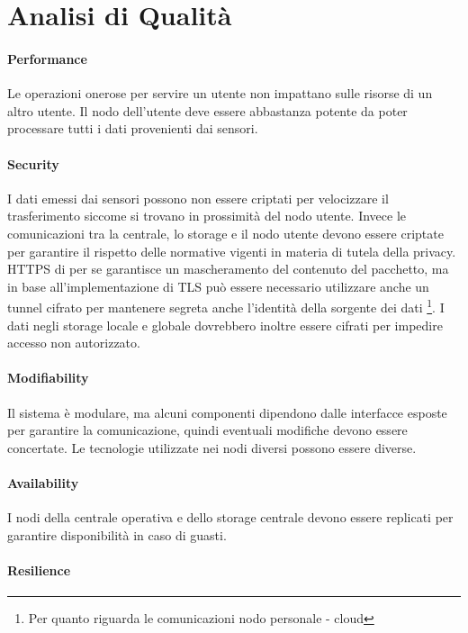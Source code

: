 \documentclass[a4paper,11pt,oneside, table]{article}
\begin{document}
\section{Analisi di Qualit\`a}

\paragraph{Performance}

Le operazioni onerose per servire un utente non impattano sulle risorse di un altro utente.
Il nodo dell'utente deve essere abbastanza potente da poter processare tutti i dati provenienti dai sensori.

\paragraph{Security}

I dati emessi dai sensori possono non essere criptati per velocizzare il trasferimento siccome si trovano in prossimit\`a del nodo utente. Invece le comunicazioni tra la centrale, lo storage e il nodo utente devono essere criptate per garantire il rispetto delle normative vigenti in materia di tutela della privacy. HTTPS di per se garantisce un mascheramento del contenuto del pacchetto, ma in base all'implementazione di TLS pu\`o essere necessario utilizzare anche un tunnel cifrato per mantenere segreta anche l'identit\`a della sorgente dei dati \footnote{Per quanto riguarda le comunicazioni nodo personale - cloud}. I dati negli storage locale e globale dovrebbero inoltre essere cifrati per impedire accesso non autorizzato.

\paragraph{Modifiability}

Il sistema \`e modulare, ma alcuni componenti dipendono dalle interfacce esposte per garantire la comunicazione, quindi eventuali modifiche devono essere concertate. Le tecnologie utilizzate nei nodi diversi possono essere diverse.

\paragraph{Availability}

I nodi della centrale operativa e dello storage centrale devono essere replicati per garantire disponibilit\`a in caso di guasti.

\paragraph{Resilience}
\end{document}
